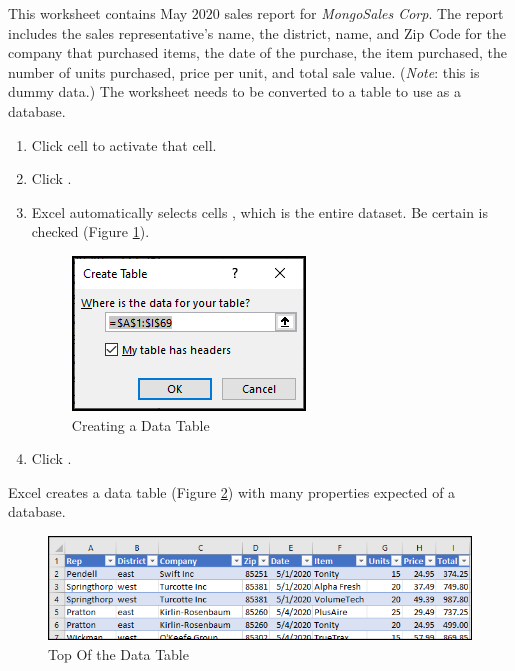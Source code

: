 This worksheet contains May $ 2020 $ sales report for \textit{MongoSales Corp}. The report includes the sales representative's name, the district, name, and Zip Code for the company that purchased items, the date of the purchase, the item purchased, the number of units purchased, price per unit, and total sale value. (\textit{Note}: this is dummy data.) The worksheet needs to be converted to a table to use as a database.

\begin{enumbox}
	\begin{enumerate}
		\item Click cell  to activate that cell.
		\item Click .
		\item Excel automatically selects cells , which is the entire dataset. Be certain  is checked (Figure \ref{09:fig10}).
	
		\begin{figure}[H]
			\centering
			\includegraphics[width=\maxwidth{.50\linewidth}]{gfx/ch09_fig10}
			\caption{Creating a Data Table}
			\label{09:fig10}
		\end{figure}
		
		\item Click .
	\end{enumerate}
\end{enumbox}

Excel creates a data table (Figure \ref{09:fig11}) with many properties expected of a database. 

\begin{figure}[H]
	\centering
	\includegraphics[width=\maxwidth{.95\linewidth}]{gfx/ch09_fig11}
	\caption{Top Of the Data Table}
	\label{09:fig11}
\end{figure}

